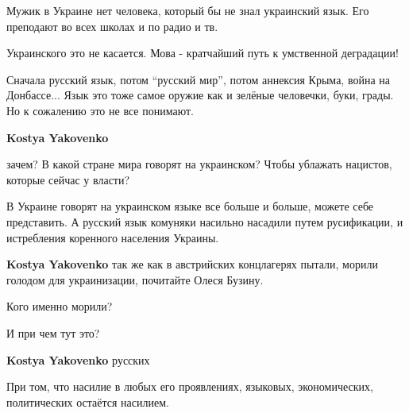\begin{itemize}
\begin{itemize}
Мужик в Украине нет человека, который бы не знал украинский язык. Его преподают
во всех школах и по радио и тв.

Украинского это не касается. Мова - кратчайший путь к умственной деградации!



Сначала русский язык, потом \enquote{русский мир}, потом аннексия Крыма, война на
Донбассе... Язык это тоже самое оружие как и зелёные человечки, буки, грады. Но
к сожалению это не все понимают.



\textbf{Kostya Yakovenko} 

зачем? В какой стране мира говорят на украинском? Чтобы ублажать нацистов,
которые сейчас у власти?


В Украине говорят на украинском языке все больше и больше, можете себе
представить. А русский язык комуняки насильно насадили путем русификации, и
истребления коренного населения Украины.



\textbf{Kostya Yakovenko} так же как в австрийских концлагерях пытали, морили
голодом для украинизации, почитайте Олеся Бузину.




Кого именно морили?



И при чем тут это?

\textbf{Kostya Yakovenko} русских


При том, что насилие в любых его проявлениях, языковых, экономических,
политических остаётся насилием.


\end{itemize}
\end{itemize}
